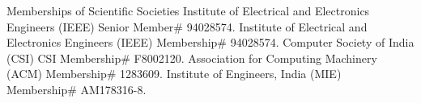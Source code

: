 \begin{rubric}{Memberships of Scientific Societies}
\entry*[16/8/2021-present] Institute of Electrical and Electronics Engineers (IEEE) Senior Member\# 94028574.
\entry*[21/9/2016-15/08/2021] Institute of Electrical and Electronics Engineers (IEEE) Membership\# 94028574.
\entry*[01/10/2016-present] Computer Society of India (CSI) CSI Membership\# F8002120.
\entry*[01/10/2018-present] Association for Computing Machinery (ACM) Membership\# 1283609.
\entry*[12/7/2016-present] Institute of Engineers, India (MIE) Membership\# AM178316-8.
\end{rubric}